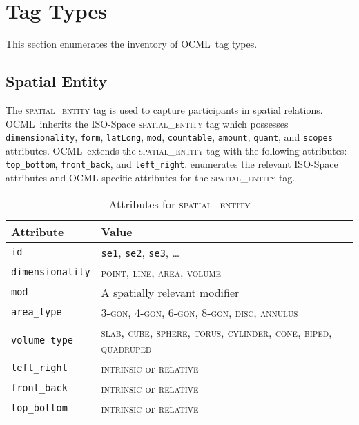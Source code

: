 \documentclass[11pt]{article}
\newcommand{\ML}{OCML}
\newenvironment{attributes}
{
\begin{tabular}{|l|l|}
    \hline \textbf{Attribute} & \textbf{Value}\\
}
{   \hline
\end{tabular}
}
\begin{document}
\section{Tag Types} %
\label{sec:tag_types}

This section enumerates the inventory of \ML~tag types.

\subsection{Spatial Entity} %
\label{sub:spatial_entity}

The \textsc{spatial\_entity} tag is used to capture participants in spatial relations. \ML~inherits the ISO-Space \textsc{spatial\_entity} tag which possesses \texttt{dimensionality}, \texttt{form}, \texttt{latLong}, \texttt{mod}, \texttt{countable}, \texttt{amount}, \texttt{quant}, and \texttt{scopes} attributes. \ML~extends the \textsc{spatial\_entity} tag with the following attributes: \texttt{top\_bottom}, \texttt{front\_back}, and \texttt{left\_right}.  enumerates the relevant ISO-Space attributes and \ML-specific attributes for the \textsc{spatial\_entity} tag.

\begin{table}[h]
\centering
\begin{attributes}
    \hline \texttt{id}                  & \texttt{se1}, \texttt{se2}, 
                                          \texttt{se3}, \ldots\\
    \hline \texttt{dimensionality}      & \textsc{point}, \textsc{line}, \textsc{area}, \textsc{volume}\\
    \hline \texttt{mod}                 & A spatially relevant modifier\\
    \hline \texttt{area\_type}          & \textsc{3-gon}, \textsc{4-gon}, \textsc{6-gon}, \textsc{8-gon}, \textsc{disc}, \textsc{annulus}\\
    \hline \texttt{volume\_type}        & \textsc{slab}, \textsc{cube}, \textsc{sphere}, \textsc{torus}, \textsc{cylinder}, \textsc{cone}, \textsc{biped}, \textsc{quadruped}\\
    \hline \texttt{left\_right}         & \textsc{intrinsic} or \textsc{relative}\\
    \hline \texttt{front\_back}         & \textsc{intrinsic} or \textsc{relative}\\
    \hline \texttt{top\_bottom}         & \textsc{intrinsic} or \textsc{relative}\\
\end{attributes}
\caption{Attributes for \textsc{spatial\_entity}}
\label{tab:spatial_entity}
\end{table}
\end{document}

